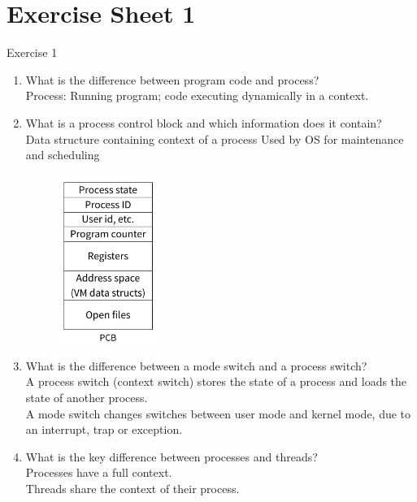 \documentclass[10pt]{beamer}
\begin{document}
\section{Exercise Sheet 1}
\frame{\sectionpage}
\begin{frame}[allowframebreaks]{Exercise 1}
    	\begin{enumerate}
		\item What is the difference between program code and process? \\
		\alert{Process: Running program; code executing dynamically in a context.}
		
		\item What is a process control block and which information does it contain? \\
		\alert{Data structure containing context of a process
		Used by OS for maintenance and scheduling}
        \begin{figure}
          \includegraphics[keepaspectratio, width=0.3\textwidth, height=0.6\textheight-2\baselineskip-2\baselineskip]{img/000_pcb.png}
        \end{figure}
		
		
		\item What is the difference between a mode switch and a process switch? \\
		\alert{A process switch (context switch) stores the state of a process and loads the state of another process. \\
		A mode switch changes switches between user mode and kernel mode, due to an interrupt, trap or exception.}
		
		\item What is the key difference between processes and threads? \\
		\alert{Processes have a full context. \\
		Threads share the context of their process.}
		\framebreak
		

\end{enumerate}
\end{frame}
\end{document}
